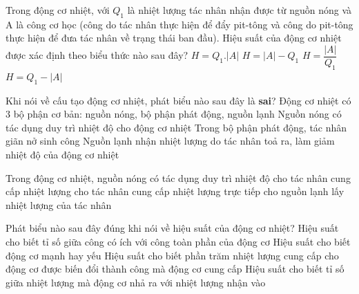 \begin{ex} 
	Trong động cơ nhiệt, với $Q_1$ là nhiệt lượng tác nhân nhận được từ nguồn nóng và A là công cơ học (công do tác nhân thực hiện để đẩy pit-tông và công do pit-tông thực hiện để đưa tác nhân về trạng thái ban đầu). Hiệu suất của động cơ nhiệt được xác định theo biểu thức nào sau đây?
	\choice
	{$H=Q_1 . |A|$}
	{$H=|A|-Q_1$}
	{\True $H=\dfrac{|A|}{Q_1}$}
	{$H=Q_1-|A|$}
\end{ex}
\begin{ex}%
	Khi nói về cấu tạo động cơ nhiệt, phát biểu nào sau đây là  \textbf{sai}?
	\choice
	{Động cơ nhiệt có 3 bộ phận cơ bản: nguồn nóng, bộ phận phát động, nguồn lạnh}
	{\True Nguồn nóng có tác dụng duy trì nhiệt độ cho động cơ nhiệt}
	{Trong bộ phận phát động, tác nhân giãn nở sinh công}
	{Nguồn lạnh nhận nhiệt lượng do tác nhân toả ra, làm giảm nhiệt độ của động cơ nhiệt}
	\end{ex}
\begin{ex}
	Trong động cơ nhiệt, nguồn nóng có tác dụng
	\choice
	{duy trì nhiệt độ cho tác nhân}
	{\True cung cấp nhiệt lượng cho tác nhân}
	{cung cấp nhiệt lượng trực tiếp cho nguồn lạnh}
	{lấy nhiệt lượng của tác nhân}
\end{ex}
\begin{ex}
	Phát biểu nào sau đây đúng khi nói về hiệu suất của động cơ nhiệt? 
	\choice
	{Hiệu suất cho biết tỉ số giữa công có ích với công toàn phần của động cơ}
	{Hiệu suất cho biết động cơ mạnh hay yếu}
	{\True Hiệu suất cho biết phần trăm nhiệt lượng cung cấp cho động cơ được biến đổi thành công mà động cơ cung cấp}
	{Hiệu suất cho biết tỉ số giữa nhiệt lượng mà động cơ nhả ra với nhiệt lượng nhận vào}
\end{ex}	
